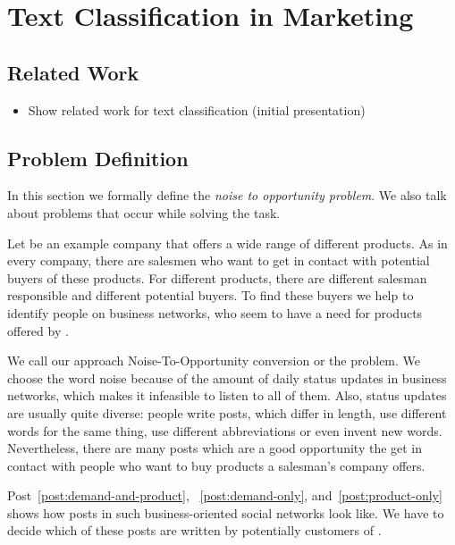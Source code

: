 
\section{Text Classification in Marketing}
\label{sec:background}

\subsection{Related Work}

\begin{itemize}
	\item Show related work for text classification (initial presentation)
\end{itemize}

\subsection{Problem Definition}
\label{sec:background-problem}

In this section we formally define the \emph{noise to opportunity problem}.
We also talk about problems that occur while solving the task.

Let \acme be an example company that offers a wide range of different products.
As in every company, there are salesmen who want to get in contact with potential buyers of these products.
For different products, there are different salesman responsible and different potential buyers.
To find these buyers we help \acme to identify people on business networks, who seem to have a need for products offered by \acme.

We call our approach Noise-To-Opportunity conversion or the \nto problem.
We choose the word noise because of the amount of daily status updates in business networks, which makes it infeasible to listen to all of them.
Also, status updates are usually quite diverse: people write posts, which differ in length, use different words for the same thing, use  different abbreviations or even invent new words.
Nevertheless, there are many posts which are a good opportunity the get in contact with people who want to buy products a salesman's company offers.

Post~\ref{post:demand-and-product}, ~\ref{post:demand-only}, and~\ref{post:product-only} shows how posts in such business-oriented social networks look like.
We have to decide which of these posts are written by potentially customers of \acme.

